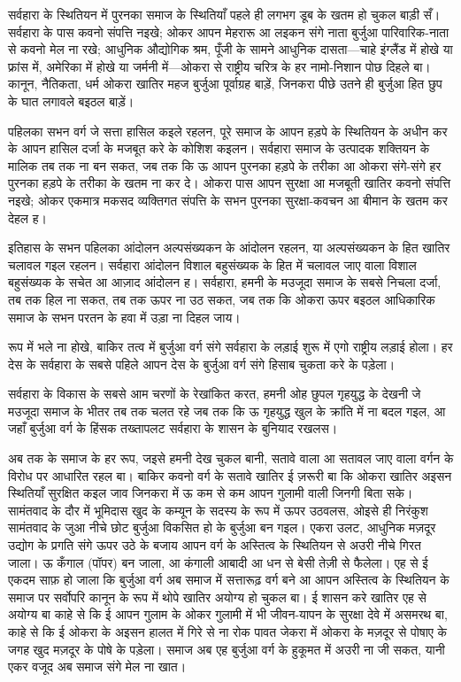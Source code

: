 \documentclass[12pt,a4paper,oneside]{book}
\begin{document}
सर्वहारा के स्थितियन में पुरनका समाज के स्थितियाँ पहले ही लगभग डूब के खतम हो चुकल बाड़ी सँ। सर्वहारा के पास कवनो संपत्ति नइखे; ओकर आपन मेहरारू आ लइकन संगे नाता बुर्जुआ पारिवारिक-नाता से कवनो मेल ना रखे; आधुनिक औद्योगिक श्रम, पूँजी के सामने आधुनिक दासता—चाहे इंग्लैंड में होखे या फ्रांस में, अमेरिका में होखे या जर्मनी में—ओकरा से राष्ट्रीय चरित्र के हर नामो-निशान पोछ दिहले बा। कानून, नैतिकता, धर्म ओकरा खातिर महज बुर्जुआ पूर्वाग्रह बाड़ें, जिनकरा पीछे उतने ही बुर्जुआ हित छुप के घात लगावले बइठल बाड़ें।

पहिलका सभन वर्ग जे सत्ता हासिल कइले रहलन, पूरे समाज के आपन हड़पे के स्थितियन के अधीन कर के आपन हासिल दर्जा के मजबूत करे के कोशिश कइलन। सर्वहारा समाज के उत्पादक शक्तियन के मालिक तब तक ना बन सकत, जब तक कि ऊ आपन पुरनका हड़पे के तरीका आ ओकरा संगे-संगे हर पुरनका हड़पे के तरीका के खतम ना कर दे। ओकरा पास आपन सुरक्षा आ मजबूती खातिर कवनो संपत्ति नइखे; ओकर एकमात्र मकसद व्यक्तिगत संपत्ति के सभन पुरनका सुरक्षा-कवचन आ बीमान के खतम कर देहल ह।

इतिहास के सभन पहिलका आंदोलन अल्पसंख्यकन के आंदोलन रहलन, या अल्पसंख्यकन के हित खातिर चलावल गइल रहलन। सर्वहारा आंदोलन विशाल बहुसंख्यक के हित में चलावल जाए वाला विशाल बहुसंख्यक के सचेत आ आज़ाद आंदोलन ह। सर्वहारा, हमनी के मउजूदा समाज के सबसे निचला दर्जा, तब तक हिल ना सकत, तब तक ऊपर ना उठ सकत, जब तक कि ओकरा ऊपर बइठल आधिकारिक समाज के सभन परतन के हवा में उड़ा ना दिहल जाय।

रूप में भले ना होखे, बाकिर तत्व में बुर्जुआ वर्ग संगे सर्वहारा के लड़ाई शुरू में एगो राष्ट्रीय लड़ाई होला। हर देस के सर्वहारा के सबसे पहिले आपन देस के बुर्जुआ वर्ग संगे हिसाब चुकता करे के पड़ेला।

सर्वहारा के विकास के सबसे आम चरणों के रेखांकित करत, हमनी ओह छुपल गृहयुद्ध के देखनी जे मउजूदा समाज के भीतर तब तक चलत रहे जब तक कि ऊ गृहयुद्ध खुल के क्रांति में ना बदल गइल, आ जहाँ बुर्जुआ वर्ग के हिंसक तख्तापलट सर्वहारा के शासन के बुनियाद रखलस।

अब तक के समाज के हर रूप, जइसे हमनी देख चुकल बानी, सतावे वाला आ सतावल जाए वाला वर्गन के विरोध पर आधारित रहल बा। बाकिर कवनो वर्ग के सतावे खातिर ई ज़रूरी बा कि ओकरा खातिर अइसन स्थितियाँ सुरक्षित कइल जाव जिनकरा में ऊ कम से कम आपन गुलामी वाली जिनगी बिता सके। सामंतवाद के दौर में भूमिदास खुद के कम्यून के सदस्य के रूप में ऊपर उठवलस, ओइसे ही निरंकुश सामंतवाद के जुआ नीचे छोट बुर्जुआ विकसित हो के बुर्जुआ बन गइल। एकरा उलट, आधुनिक मज़दूर उद्योग के प्रगति संगे ऊपर उठे के बजाय आपन वर्ग के अस्तित्व के स्थितियन से अउरी नीचे गिरत जाला। ऊ कँगाल (पॉपर) बन जाला, आ कंगाली आबादी आ धन से बेसी तेज़ी से फैलेला। एह से ई एकदम साफ़ हो जाला कि बुर्जुआ वर्ग अब समाज में सत्तारूढ़ वर्ग बने आ आपन अस्तित्व के स्थितियन के समाज पर सर्वोपरि कानून के रूप में थोपे खातिर अयोग्य हो चुकल बा। ई शासन करे खातिर एह से अयोग्य बा काहे से कि ई आपन गुलाम के ओकर गुलामी में भी जीवन-यापन के सुरक्षा देवे में असमरथ बा, काहे से कि ई ओकरा के अइसन हालत में गिरे से ना रोक पावत जेकरा में ओकरा के मज़दूर से पोषाए के जगह खुद मज़दूर के पोषे के पड़ेला। समाज अब एह बुर्जुआ वर्ग के हुकूमत में अउरी ना जी सकत, यानी एकर वजूद अब समाज संगे मेल ना खात।
\end{document}
